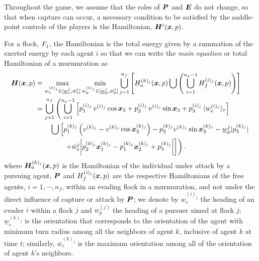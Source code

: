 Throughout the game, we assume that the roles of $\bm{P}$  and $\bm{E}$ do not change, so that when capture can occur, a necessary condition to be satisfied by the saddle-point controls of the players is the Hamiltonian, $\bm{H}^i(\bm{x}, p)$.  
%
\begin{theorem}
	For  a flock, $F_j$, the Hamiltonian is the total energy given by a summation of the exerted energy by each agent $i$ so that we can write the \textit{main equation} or total Hamiltonian of a murmuration as 
	\begin{align}
		\bm{H}(\bm{x}, p) &= \max_{w_e^{(k)_j} \in [\underline{w}_e^j, \bar{w}_e^j]}  \min_{w_p^{(k)_j}  \in [\underline{w}_p^{j}, \bar{w}_p^j]} \bigcup_{j=1}^{n_f} \left[ H^{(k)_j}_a(\bm{x}, p) \bigcup \left( \bigcup_{i=1}^{n_a-1} H^{(i)_j}_f(\bm{x}, p) \right) \right] 
		\\
		& = \bigcup_{j=1}^{n_f} \left( \bigcup_{i=1}^{n_a-1} 
			\left[p_1^{(i)_j} \, v^{(i)_j} \cos \bm{x}_3 + p_2^{(i)_j} \, v^{(i)_j} \sin \bm{x}_3 + p_3^{(i)_j}\, \langle w_e^{(i)_j}\rangle_r\right] \right.\nonumber \\
			& \qquad \left. \bigcup \left[
			p_1^{(k)_j} \left(v^{(k)_j}  - v^{(k)_j} \cos \bm{x}_3^{(k)_j}\right) - p_2^{(k)_j} v^{(k)_j} \sin \bm{x}_3^{(k)_j} - \underline{w}_p^j |p_3^{(k)_j}|   \right. \right. \nonumber \\
			& \qquad \qquad \left.  \left. 
			+ \bar{w}_e^j \bigg|p_2^{(k)_j} \bm{x}_1^{(k)_j} - p_1^{(k)_j}\bm{x}_2^{(k)_j} + p_3^{(k)_j}\bigg|
			\right] \right).
		\label{eq:HamiltonianOverall}
	\end{align}
	where $\bm{H}^{(k)_j}_a(\bm{x}, p)$ is the  Hamiltonian of the individual under attack by a pursuing agent, $\bm{P}$ and $H^{(i)_j}_f(\bm{x}, p)$ are the respective Hamiltonians of the free agents, $i=1, \cdots, n_f$, within an evading flock in a murmuration, and not under the direct influence of capture or attack by $\bm{P}$; we denote by  $w_e^{(i)_j}$ the heading of an evader $i$ within a flock $j$ and $w_p^{(j)}$  the heading of a pursuer aimed at flock $j$; $\underline{w}_e^{(k)_j}$ is the orientation that corresponds to  the orientation of the agent with minimum turn radius among all the neighbors of agent $k$, inclusive of agent $k$ at time $t$; similarly, $\bar{w}_e^{(k)_j}$ is  the maximum orientation among all of the orientation of agent $k$'s neighbors. 
	\label{th:ham_sum}
\end{theorem}
%

